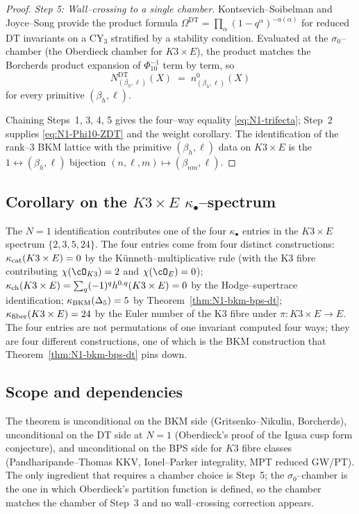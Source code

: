 \begin{proof}
\emph{Step 5: Wall--crossing to a single chamber.} Kontsevich--Soibelman
\cite{KS2008} and Joyce--Song \cite{JS2012} provide the product formula
$\Omega^{\mathrm{DT}} = \prod_\alpha (1 - q^\alpha)^{-a(\alpha)}$ for reduced
DT invariants on a CY$_3$ stratified by a stability condition. Evaluated at the
$\sigma_0$--chamber (the Oberdieck chamber for $K3 \times E$), the product
matches the Borcherds product expansion of $\Phi_{10}^{-1}$ term by term, so
\[
N^{\mathrm{DT}}_{(\beta_h, \ell)}(X) \;=\; n^0_{(\beta_h, \ell)}(X)
\]
for every primitive $(\beta_h, \ell)$.

Chaining Steps~1, 3, 4, 5 gives the four--way equality \eqref{eq:N1-trifecta};
Step~2 supplies \eqref{eq:N1-Phi10-ZDT} and the weight corollary. The
identification of the rank--$3$ BKM lattice with the primitive $(\beta_h, \ell)$
data on $K3 \times E$ is the $1 \leftrightarrow (\beta_h, \ell)$ bijection
$(n, \ell, m) \mapsto (\beta_{nm}, \ell)$.
\end{proof}

\subsection{Corollary on the $K3 \times E$ $\kappa_\bullet$--spectrum}

The $N=1$ identification contributes one of the four $\kappa_\bullet$ entries
in the $K3 \times E$ spectrum $\{2, 3, 5, 24\}$. The four entries come from
four distinct constructions: $\kappa_{\mathrm{cat}}(K3 \times E) = 0$ by the
K\"unneth--multiplicative rule (with the K3 fibre contributing $\chi(\cO_{K3}) = 2$
and $\chi(\cO_E) = 0$); $\kappa_{\mathrm{ch}}(K3 \times E) = \sum_q (-1)^q h^{0,q}(K3 \times E) = 0$
by the Hodge--supertrace identification; $\kappa_{\mathrm{BKM}}(\Delta_5) = 5$ by
Theorem~\ref{thm:N1-bkm-bps-dt}; $\kappa_{\mathrm{fiber}}(K3 \times E) = 24$ by the Euler number
of the K3 fibre under $\pi: K3 \times E \to E$. The four entries are not
permutations of one invariant computed four ways; they are four different
constructions, one of which is the BKM construction that Theorem~\ref{thm:N1-bkm-bps-dt}
pins down.

\subsection{Scope and dependencies}

The theorem is unconditional on the BKM side (Gritsenko--Nikulin, Borcherds),
unconditional on the DT side at $N = 1$ (Oberdieck's proof of the Igusa cusp
form conjecture), and unconditional on the BPS side for $K3$ fibre classes
(Pandharipande--Thomas KKV, Ionel--Parker integrality, MPT reduced GW/PT). The
only ingredient that requires a chamber choice is Step~5; the $\sigma_0$--chamber
is the one in which Oberdieck's partition function is defined, so the chamber
matches the chamber of Step~3 and no wall--crossing correction appears.

